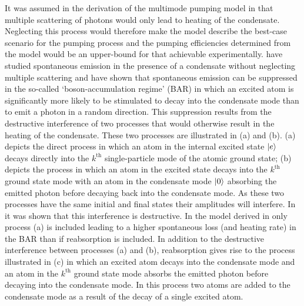 It was assumed in the derivation of the multimode pumping model in  that multiple scattering of photons would only lead to heating of the condensate.  Neglecting this process would therefore make the model describe the best-case scenario for the pumping process and the pumping efficiencies determined from the model would be an upper-bound for that achievable experimentally.  \citeauthor{Cirac:1996rr} have studied spontaneous emission in the presence of a condensate without neglecting multiple scattering \citep{Cirac:1996rr} and have shown that spontaneous emission can be suppressed in the so-called `boson-accumulation regime' (BAR) in which an excited atom is significantly more likely to be stimulated to decay into the condensate mode than to emit a photon in a random direction.  This suppression results from the destructive interference of two processes that would otherwise result in the heating of the condensate.  These two processes are illustrated in (a) and (b). (a) depicts the direct process in which an atom in the internal excited state ${\left|e\right>}$ decays directly into the $k^\text{th}$ single-particle mode of the atomic ground state; (b) depicts the process in which an atom in the excited state decays into the $k^\text{th}$ ground state mode with an atom in the condensate mode ${\left|0\right>}$ absorbing the emitted photon before decaying back into the condensate mode.  As these two processes have the same initial and final states their amplitudes will interfere.  In \citep{Cirac:1996rr} it was shown that this interference is destructive.  In the model derived in  only process (a) is included leading to a higher spontaneous loss (and heating rate) in the BAR than if reabsorption is included.  In addition to the destructive interference between processes (a) and (b), reabsorption gives rise to the process illustrated in (c) in which an excited atom decays into the condensate mode and an atom in the $k^\text{th}$ ground state mode absorbs the emitted photon before decaying into the condensate mode.  In this process two atoms are added to the condensate mode as a result of the decay of a single excited atom.

